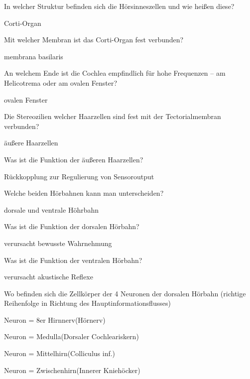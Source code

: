 \documentclass[10pt, a4paper]{exam}
\begin{document}
\begin{questions}
  \question In welcher Struktur befinden sich die Hörsinneszellen und wie heißen diese?
  \begin{solution}
    Corti-Organ
  \end{solution}

  \question Mit welcher Membran ist das Corti-Organ fest verbunden?
  \begin{solution}
    membrana basilaris
  \end{solution}

  \question An welchem Ende ist die Cochlea empfindlich für hohe Frequenzen – am Helicotrema oder am ovalen Fenster?
  \begin{solution}
    ovalen Fenster
  \end{solution}

  \question Die Stereozilien welcher Haarzellen sind fest mit der Tectorialmembran verbunden?
  \begin{solution}
    äußere Haarzellen
  \end{solution}

  \question Was ist die Funktion der äußeren Haarzellen?
  \begin{solution}
    Rückkopplung zur Regulierung von Sensoroutput
  \end{solution}

  \question Welche beiden Hörbahnen kann man unterscheiden?
  \begin{solution}
    dorsale und ventrale Höhrbahn
  \end{solution}

  \question Was ist die Funktion der dorsalen Hörbahn?
  \begin{solution}
    verursacht bewusste Wahrnehmung
  \end{solution}

  \question Was ist die Funktion der ventralen Hörbahn?
  \begin{solution}
    verursacht akustische Reflexe
  \end{solution}

  \question Wo befinden sich die Zellkörper der 4 Neuronen der dorsalen Hörbahn (richtige Reihenfolge in Richtung des Hauptinformationsflusses)
  \begin{solution}
    \begin{enumerate*}
      \item Neuron = 8er Hirnnerv(Hörnerv)
      \item Neuron = Medulla(Dorsaler Cochleariskern)
      \item Neuron = Mittelhirn(Colliculus inf.)
      \item Neuron = Zwischenhirn(Innerer Kniehöcker)
    \end{enumerate*}
  \end{solution}


\end{questions}
\end{document}
